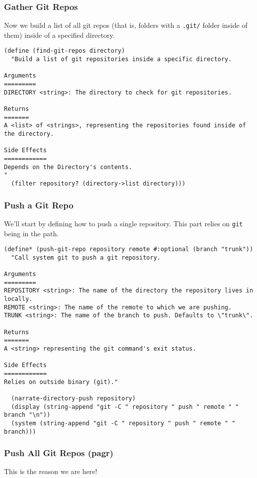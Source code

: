 \documentclass[11pt]{article}
\begin{document}
\subsubsection{Gather Git Repos}
\label{sec:org472ceee}
Now we build a list of all git repos (that is, folders with a \texttt{.git/} folder
inside of them) inside of a specified directory.

\begin{verbatim}
(define (find-git-repos directory)
  "Build a list of git repositories inside a specific directory.

Arguments
=========
DIRECTORY <string>: The directory to check for git repositories.

Returns
=======
A <list> of <strings>, representing the repositories found inside of the directory.

Side Effects
============
Depends on the Directory's contents.
"
  (filter repository? (directory->list directory)))
\end{verbatim}

\subsubsection{Push a Git Repo}
\label{sec:org80edf88}
We'll start by defining how to push a single repository. This part relies on
\texttt{git} being in the path.

\begin{verbatim}
(define* (push-git-repo repository remote #:optional (branch "trunk"))
  "Call system git to push a git repository.

Arguments
=========
REPOSITORY <string>: The name of the directory the repository lives in locally.
REMOTE <string>: The name of the remote to which we are pushing.
TRUNK <string>: The name of the branch to push. Defaults to \"trunk\".

Returns
=======
A <string> representing the git command's exit status.

Side Effects
============
Relies on outside binary (git)."

  (narrate-directory-push repository)
  (display (string-append "git -C " repository " push " remote " " branch "\n"))
  (system (string-append "git -C " repository " push " remote " " branch)))
\end{verbatim}

\subsubsection{Push All Git Repos (pagr)}
\label{sec:org6b42428}
This is the reason we are here!
\end{document}
